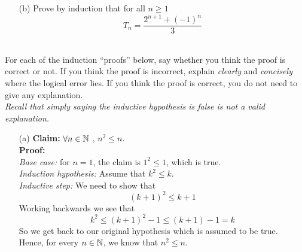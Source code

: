 \documentclass[11pt]{article}
\newif\ifsolutions
\renewcommand{\answer}[1]{{\color{mydarkblue}\textbf{Solutions: }#1}}
\begin{document}
\begin{qunlist}
\begin{itemize}
\newpage

\item[(b)] Prove by induction that for all $n \geq 1$
\[ T_n = \frac{2^{n+1}+(-1)^n}{3} \]

\ifsolutions
\answer{
(Strong Induction) $P(n=k)$ asserts that $T_k = \frac{2^{k+1}+(-1)^k}{3}$. 
We prove the statement by (strong) induction on $k$, showing that $P(k-2) \wedge P(k-1) \implies P(k)$.

\underline{Base cases:} $T_1 = 1$ as there is exactly one way to tile a $2 \times 1$ board, 
using tile \textbf{B}.
The $2 \times 2$ board can be tiled in exactly three different ways 
using the tiles \textbf{AA, BB} and \textbf{C},
so $T_2 = 3$. The base cases are true as 
\[P(1)=T_1=1=\frac{2^2+(-1)}{3} \quad\quad\quad P(2)=T_2=3=\frac{2^3+1}{3}\]

\underline{Induction Hypothesis:} Assume $P(k-1)$ and $P(k-2)$ are true for all $n=k > 2$.

\underline{Inductive step:} Using the recurrence relation derived in part (a), we have,
\begin{align*} 
T_k &= T_{k-1} + 2T_{k-2} \\
&= \frac{2^k + (-1)^{k-1}}{3}+2\cdot\frac{2^{k-1}+(-1)^{k-2}}{3}  &\text{[by induction hypothesis]} \\
&= \frac{2\cdot 2^k+(-1)^{k-2}(-1+2)}{3} \\
&= \frac{2^{k+1}+(-1)^k}{3}  &\text{[as } (-1)^{k-2} = (-1)^k \text{]} \\
\end{align*}
The claim is therefore true by (strong) induction for all natural numbers $n=k \geq 1$.
}
\fi


\end{itemize}



\pagebreak

 \\
For each of the induction ``proofs'' below, say whether you think the proof is correct or not.
If you think the proof is incorrect, 
explain \textit{clearly} and \textit{concisely} where the logical error lies.
If you think the proof is correct, you do not need to give any explanation. \\
\textit{Recall that simply saying the inductive hypothesis is false is not a valid explanation.}

\begin{itemize}
\item[(a)] \textbf{Claim:} $\forall n \in \mathbb{N}$ , $n^2 \leq n$. \\
\textbf{Proof:} \\
\textit{Base case:} for $n = 1$, the claim is $1^2 \leq 1$, which is true. \\
\textit{Induction hypothesis:} Assume that $k^2 \leq k$. \\
\textit{Inductive step:} We need to show that 
\[ (k+1)^2 \leq k+1\]
Working backwards we see that 
\[ k^2 \leq (k+1)^2 - 1 \leq (k+1) - 1 = k \]
So we get back to our original hypothesis which is assumed to be true.\\
Hence, for every $n \in \mathbb{N}$, we know that $n^2 \leq n$. 


\end{itemize}
\end{qunlist}
\end{document}
